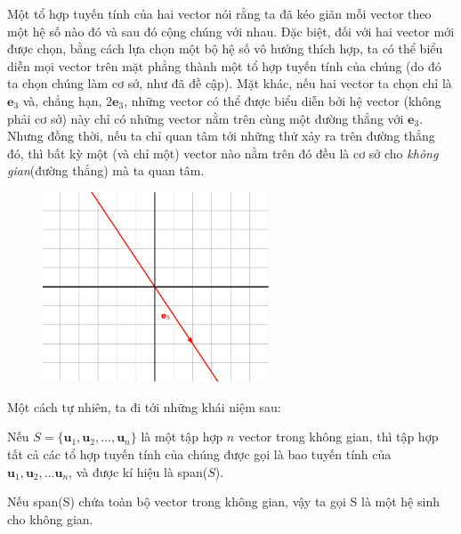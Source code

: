 Một tổ hợp tuyến tính của hai vector nói rằng ta đã kéo giãn mỗi vector theo một hệ số nào đó và sau đó cộng chúng với nhau. Đặc biệt, đối với hai vector mới được chọn, bằng cách lựa chọn một bộ hệ số vô hướng thích hợp, ta có thể biểu diễn mọi vector trên mặt phẳng thành một tổ hợp tuyến tính của chúng (do đó ta chọn chúng làm cơ sở, như đã đề cập). 
Mặt khác, nếu hai vector ta chọn chỉ là \(\mathbf{e}_3\) và, chẳng hạn, \(2\mathbf{e}_3\), những vector có thể được biểu diễn bởi hệ vector (không phải cơ sở) này chỉ có những vector nằm trên cùng một đường thẳng với \(\mathbf{e}_3\). Nhưng đồng thời, nếu ta chỉ quan tâm tới 
những thứ xảy ra trên đường thẳng đó, thì bất kỳ một (và chỉ một) vector nào nằm trên đó đều là cơ sở cho \emph{không gian}(đường thẳng) mà ta quan tâm.
\begin{figure}[H]
    \centering
    \includegraphics[width=0.6\textwidth]{Tuan2/Figures/avectoronaline.png}
\end{figure}

\vspace{8pt}

Một cách tự nhiên, ta đi tới những khái niệm sau:
\begin{definition}
    Nếu \(S=\{\mathbf{u}_{1}, \mathbf{u}_{2},\dots,  \mathbf{u}_{n}\}\) là một tập hợp \(n\) vector trong không gian, thì tập hợp tất cả các tổ hợp tuyến tính của chúng được gọi là bao tuyến tính của \(\mathbf{u}_{1}, \mathbf{u}_{2},\dots \mathbf{u}_{n}\), và được kí hiệu là span(\(S\)).
    \vspace{8pt}

    Nếu span(S) chứa toàn bộ vector trong không gian, vậy ta gọi S là một hệ sinh cho không gian.
\end{definition}


